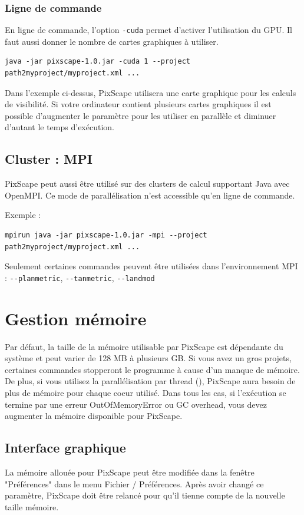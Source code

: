 \documentclass{report}
\begin{document}
\subsubsection{Ligne de commande}
En ligne de commande, l'option \verb|-cuda| permet d'activer l'utilisation du GPU. Il faut aussi donner le nombre de cartes graphiques à utiliser.

\begin{Verbatim}
java -jar pixscape-1.0.jar -cuda 1 --project path2myproject/myproject.xml ...
\end{Verbatim}
Dans l'exemple ci-dessus, PixScape utilisera une carte graphique pour les calculs de visibilité. Si votre ordinateur contient plusieurs cartes graphiques il est possible d'augmenter le paramètre pour les utiliser en parallèle et diminuer d'autant le temps d'exécution.


\subsection{Cluster : MPI}
PixScape peut aussi être utilisé sur des clusters de calcul supportant Java avec OpenMPI. Ce mode de parallélisation n'est accessible qu'en ligne de commande.

Exemple :
\begin{Verbatim}
mpirun java -jar pixscape-1.0.jar -mpi --project path2myproject/myproject.xml ...
\end{Verbatim}
Seulement certaines commandes peuvent être utilisées dans l'environnement MPI : \verb|--planmetric|, \verb|--tanmetric|, \verb|--landmod|


\section{Gestion mémoire}
\label{memory}
Par défaut, la taille de la mémoire utilisable par PixScape est dépendante du système et peut varier de 128 MB à plusieurs GB.
Si vous avez un gros projets, certaines commandes stopperont le programme à cause d'un manque de mémoire. De plus, si vous utilisez la parallélisation par thread (), PixScape aura besoin de plus de mémoire pour chaque coeur utilisé.
Dans tous les cas, si l'exécution se termine par une erreur OutOfMemoryError ou GC overhead, vous devez augmenter la mémoire disponible pour PixScape.

\subsection{Interface graphique}
La mémoire allouée pour PixScape peut être modifiée dans la fenêtre "Préférences" dans le menu Fichier / Préférences. Après avoir changé ce paramètre, PixScape doit être relancé pour qu'il tienne compte de la nouvelle taille mémoire.
\end{document}

